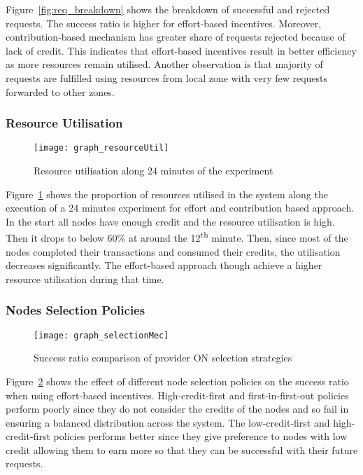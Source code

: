 Figure~\ref{fig:req_breakdown} shows the breakdown of successful and rejected requests. 
The success ratio is higher for effort-based incentives.
Moreover, contribution-based mechanism has greater share of requests rejected because of lack of credit.
This indicates that effort-based incentives result in better efficiency as more resources remain utilised.
Another observation is that majority of requests are fulfilled using resources from local zone with very few requests forwarded to other zones. 

 

\subsubsection{Resource Utilisation}
\begin{figure}[htb]
   \centering
   \texttt{[image: graph\_resourceUtil]}
   \caption{Resource utilisation along 24 minutes of the experiment}
   \label{fig:res_util}
\end{figure}

Figure~\ref{fig:res_util} shows the proportion of resources utilised in the system along the execution of a 24 minutes experiment for effort and contribution based approach. In the start all nodes have enough credit and the resource utilisation is high. Then it drops to below 60\% at around the 12\textsuperscript{th} minute. 
Then, since most of the nodes completed their transactions and consumed their credits, the utilisation decreases significantly. The effort-based approach though achieve a higher resource utilisation during that time. 


\subsubsection{Nodes Selection Policies}
\begin{figure}[htb]
   \centering
   \texttt{[image: graph\_selectionMec]}
   \caption{Success ratio comparison of provider ON selection strategies}
   \label{fig:selection_mech}
\end{figure}

Figure~\ref{fig:selection_mech} shows the effect of different node selection policies on the success ratio when using effort-based incentives. 
High-credit-first and first-in-first-out policies perform poorly since they do not consider the credits of the nodes and so fail in ensuring a balanced distribution across the system. 
The low-credit-first and high-credit-first policies performs better since they give preference to nodes with low credit allowing them to earn more so that they can be successful with their future requests.

